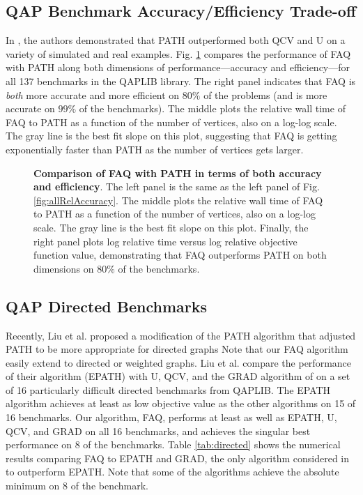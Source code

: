 \documentclass[10pt]{article}
\begin{document}
\subsection{QAP Benchmark Accuracy/Efficiency Trade-off} 
\label{sub:tradeoff}


In \cite{Zaslavskiy2009}, the authors demonstrated that PATH outperformed both QCV and U on a variety of simulated and real examples.  Fig. \ref{fig:tradeoff} compares the performance of FAQ with PATH along both dimensions of performance---accuracy and efficiency---for all 137 benchmarks in the QAPLIB library.  The right panel indicates that FAQ is {\it both} more accurate and more efficient on $80\%$ of the problems (and is more accurate on $99\%$ of the benchmarks).  The middle plots the relative wall time of FAQ to PATH as a function of the number of vertices, also on a log-log scale.  The gray line is the best fit slope on this plot, suggesting that FAQ is getting exponentially faster than PATH as the number of vertices gets larger.

\begin{figure}[h!]
	\centering
	\caption{{\bf Comparison of FAQ with PATH in terms of both accuracy and efficiency}.  The left panel is the same as the left panel of Fig. \ref{fig:allRelAccuracy}.  The middle plots the relative wall time of FAQ to PATH as a function of the number of vertices, also on a log-log scale.  The gray line is the best fit slope on this plot.  Finally, the right panel plots log relative time versus log relative objective function value, demonstrating that FAQ outperforms PATH on both dimensions on $80\%$ of the benchmarks.}
	\label{fig:tradeoff}
\end{figure}

\subsection{QAP Directed Benchmarks}
\label{sub:directed}


Recently, Liu et al. \cite{Liu2012} proposed a modification of the PATH algorithm that adjusted PATH to be more appropriate for directed graphs
Note that our FAQ algorithm 
easily extend to directed or weighted graphs.
Liu et al. compare the performance of their algorithm (EPATH) with U, QCV, and the GRAD algorithm of \cite{Gold1996} on a set of 16 particularly difficult directed benchmarks from QAPLIB.  The EPATH algorithm achieves at least as low objective value as the other algorithms on 15 of 16 benchmarks.  Our algorithm, FAQ, performs at least as well as EPATH, U, QCV, and GRAD on all 16 benchmarks, and achieves the singular best performance on 8 of the benchmarks.  Table \ref{tab:directed} shows the numerical results comparing FAQ to EPATH and GRAD, the only algorithm considered in \cite{Liu2012} to outperform EPATH.  Note that some of the algorithms achieve the absolute minimum on 8 of the benchmark. 
\end{document}
